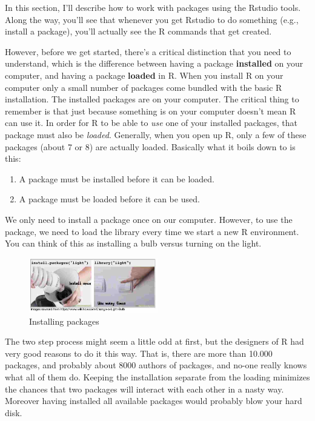 \documentclass[
  12pt,
  oneside]{book}
\providecommand{\tightlist}{%
  \setlength{\itemsep}{0pt}\setlength{\parskip}{0pt}}
\theoremstyle{definition}
\theoremstyle{definition}
\theoremstyle{definition}
\theoremstyle{definition}
\theoremstyle{remark}
\begin{document}
In this section, I'll describe how to work with packages using the Rstudio tools. Along the way, you'll see that whenever you get Rstudio to do something (e.g., install a package), you'll actually see the R commands that get created.

However, before we get started, there's a critical distinction that you need to understand, which is the difference between having a package \textbf{installed} on your computer, and having a package \textbf{loaded} in R. When you install R on your computer only a small number of packages come bundled with the basic R installation. The installed packages are on your computer. The critical thing to remember is that just because something is on your computer doesn't mean R can use it. In order for R to be able to \emph{use} one of your installed packages, that package must also be \emph{loaded}. Generally, when you open up R, only a few of these packages (about 7 or 8) are actually loaded. Basically what it boils down to is this:

\begin{enumerate}
\def\labelenumi{\arabic{enumi}.}
\tightlist
\item
  A package must be installed before it can be loaded.
\item
  A package must be loaded before it can be used.
\end{enumerate}

We only need to install a package once on our computer. However, to use the package, we need to load the library every time we start a new R environment. You can think of this as installing a bulb versus turning on the light.

\begin{figure}
\centering
\includegraphics[width=0.5\textwidth,height=\textheight]{fig/lightpackage.jpeg}
\caption{\label{fig:lightpackage} Installing packages}
\end{figure}

The two step process might seem a little odd at first, but the designers of R had very good reasons to do it this way. That is, there are more than 10.000 packages, and probably about 8000 authors of packages, and no-one really knows what all of them do. Keeping the installation separate from the loading minimizes the chances that two packages will interact with each other in a nasty way. Moreover having installed all available packages would probably blow your hard disk.
\end{document}
